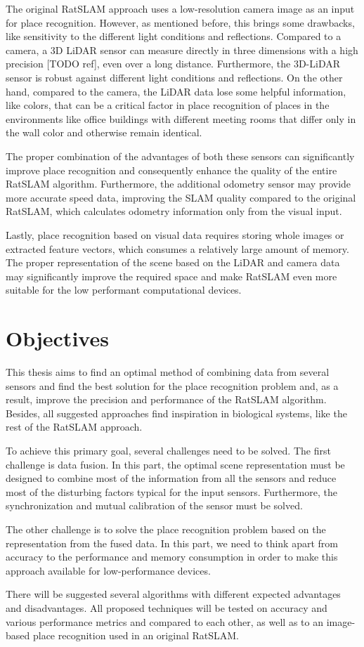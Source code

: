 The original RatSLAM approach uses a low-resolution camera image as an input for place recognition. However, as mentioned before, this brings some drawbacks, like sensitivity to the different light conditions and reflections. Compared to a camera, a 3D LiDAR sensor can measure directly in three dimensions with a high precision [TODO ref], even over a long distance. Furthermore, the 3D-LiDAR sensor is robust against different light conditions and reflections. On the other hand, compared to the camera, the LiDAR data lose some helpful information, like colors, that can be a critical factor in place recognition of places in the environments like office buildings with different meeting rooms that differ only in the wall color and otherwise remain identical.\par
The proper combination of the advantages of both these sensors can significantly improve place recognition and consequently enhance the quality of the entire RatSLAM algorithm. Furthermore, the additional odometry sensor may provide more accurate speed data, improving the SLAM quality compared to the original RatSLAM, which calculates odometry information only from the visual input.\par
Lastly, place recognition based on visual data requires storing whole images or extracted feature vectors, which consumes a relatively large amount of memory. The proper representation of the scene based on the LiDAR and camera data may significantly improve the required space and make RatSLAM even more suitable for the low performant computational devices.

\section{Objectives}\label{section:objectives}

This thesis aims to find an optimal method of combining data from several sensors and find the best solution for the place recognition problem and, as a result, improve the precision and performance of the RatSLAM algorithm. Besides, all suggested approaches find inspiration in biological systems, like the rest of the RatSLAM approach.\par
To achieve this primary goal, several challenges need to be solved. The first challenge is data fusion. In this part, the optimal scene representation must be designed to combine most of the information from all the sensors and reduce most of the disturbing factors typical for the input sensors. Furthermore, the synchronization and mutual calibration of the sensor must be solved.\par
The other challenge is to solve the place recognition problem based on the representation from the fused data. In this part, we need to think apart from accuracy to the performance and memory consumption in order to make this approach available for low-performance devices.\par
There will be suggested several algorithms with different expected advantages and disadvantages. All proposed techniques will be tested on accuracy and various performance metrics and compared to each other, as well as to an image-based place recognition used in an original RatSLAM.

